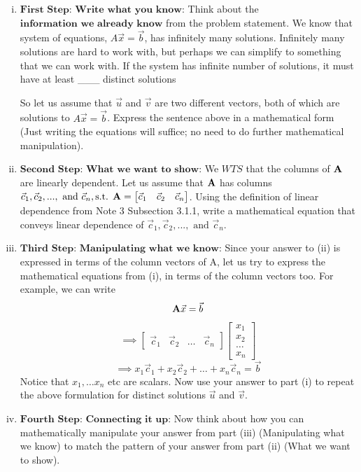 \documentclass[11pt]{article}
\begin{document}
    \begin{enumerate}[(i)]
        \item $\textbf{First Step: Write what you know:}$
        Think about the $\textbf{information we already know}$ from the problem statement. We know that system of equations, $A\vec x =\vec b$, has infinitely many solutions. Infinitely many solutions are hard to work with, but perhaps we can simplify to something that we can work with. If the system has infinite number of solutions, it must have at least \_\_\_ distinct solutions %
        \par
        So let us assume that $\vec u$ and $\vec v$ are two different vectors, both of which are solutions to $A\vec x =\vec b$.
        Express the sentence above in a mathematical form (Just writing the equations will suffice; no need to do further mathematical manipulation).
        \item $\textbf{Second Step: What we want to show:}$
            We $WTS$ that the columns of $\textbf A$ are linearly dependent. Let us assume that $\textbf A$ has columns $\vec c_1, \vec c_2, ..., \text{ and } \vec  c_n, \text{s.t. } \textbf A = \begin{bmatrix}
                                            \vec c_1 & \vec c_2 & \vec  c_n
                                          \end{bmatrix}
                                                $. Using the
            definition of linear dependence from Note 3 Subsection 3.1.1, write a mathematical equation that conveys linear dependence of $\vec c_1, \vec c_2, ..., \text{ and } \vec  c_n$.
        \item $\textbf{Third Step: Manipulating what we know:}$
        Since your answer to (ii) is expressed in terms of the column vectors of A, let us try to express the mathematical equations from (i), in terms of the column vectors too. For example, we can write
        \[
            \textbf A\vec x =\vec b
        \]
        \[
            \implies
            \begin{bmatrix}
                \vec c_1 & \vec c_2 & \ldots & \vec  c_n
            \end{bmatrix}
            \begin{bmatrix}
                x_1 \\
                x_2 \\
                \ldots \\
                x_n
            \end{bmatrix}
        \]
        \[
            \implies
            x_1\vec c_1 + x_2\vec c_2 + \ldots + x_n\vec c_n = \vec b
        \]
        Notice that $x_1, \ldots x_n$ etc are scalars. Now use your answer to part (i) to repeat the above formulation for distinct solutions $\vec u$ and $\vec v$.
        \item $\textbf{Fourth Step: Connecting it up:}$
        Now think about how you can mathematically manipulate your answer from part (iii) (Manipulating what we know) to match the pattern of your answer from part (ii) (What we want to show).
    \end{enumerate}
\end{document}
